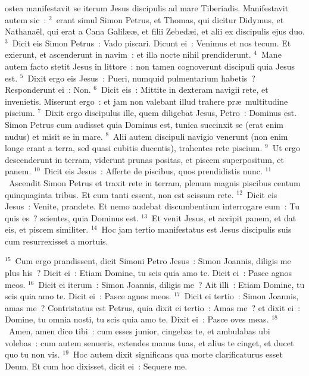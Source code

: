 \bchapter
{}ostea manifestavit se iterum Jesus discipulis ad mare Tiberiadis. Manifestavit autem sic~:
${}^{2}$~erant simul Simon Petrus, et Thomas, qui dicitur Didymus, et Nathana\"el, qui erat a Cana Galil\ae \ae , et filii Zebed\ae i, et alii ex discipulis ejus duo.
${}^{3}$~Dicit eis Simon Petrus~: Vado piscari. Dicunt ei~: Venimus et nos tecum. Et exierunt, et ascenderunt in navim~: et illa nocte nihil prendiderunt.
${}^{4}$~Mane autem facto stetit Jesus in littore~: non tamen cognoverunt discipuli quia Jesus est.
${}^{5}$~Dixit ergo eis Jesus~: Pueri, numquid pulmentarium habetis~? Responderunt ei~: Non.
${}^{6}$~Dicit eis~: Mittite in dexteram navigii rete, et invenietis. Miserunt ergo~: et jam non valebant illud trahere pr\ae\ multitudine piscium.
${}^{7}$~Dixit ergo discipulus ille, quem diligebat Jesus, Petro~: Dominus est. Simon Petrus cum audisset quia Dominus est, tunica succinxit se (erat enim nudus) et misit se in mare.
${}^{8}$~Alii autem discipuli navigio venerunt (non enim longe erant a terra, sed quasi cubitis ducentis), trahentes rete piscium.
${}^{9}$~Ut ergo descenderunt in terram, viderunt prunas positas, et piscem superpositum, et panem.
${}^{10}$~Dicit eis Jesus~: Afferte de piscibus, quos prendidistis nunc.
${}^{11}$~Ascendit Simon Petrus et traxit rete in terram, plenum magnis piscibus centum quinquaginta tribus. Et cum tanti essent, non est scissum rete.
${}^{12}$~Dicit eis Jesus~: Venite, prandete. Et nemo audebat discumbentium interrogare eum~: Tu quis es~? scientes, quia Dominus est.
${}^{13}$~Et venit Jesus, et accipit panem, et dat eis, et piscem similiter.
${}^{14}$~Hoc jam tertio manifestatus est Jesus discipulis suis cum resurrexisset a mortuis.


${}^{15}$~Cum ergo prandissent, dicit Simoni Petro Jesus~: Simon Joannis, diligis me plus his~? Dicit ei~: Etiam Domine, tu scis quia amo te. Dicit ei~: Pasce agnos meos.
${}^{16}$~Dicit ei iterum~: Simon Joannis, diligis me~? Ait illi~: Etiam Domine, tu scis quia amo te. Dicit ei~: Pasce agnos meos.
${}^{17}$~Dicit ei tertio~: Simon Joannis, amas me~? Contristatus est Petrus, quia dixit ei tertio~: Amas me~? et dixit ei~: Domine, tu omnia nosti, tu scis quia amo te. Dixit ei~: Pasce oves meas.
${}^{18}$~Amen, amen dico tibi~: cum esses junior, cingebas te, et ambulabas ubi volebas~: cum autem senueris, extendes manus tuas, et alius te cinget, et ducet quo tu non vis.
${}^{19}$~Hoc autem dixit significans qua morte clarificaturus esset Deum. Et cum hoc dixisset, dicit ei~: Sequere me.


